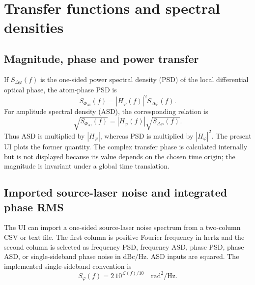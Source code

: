 \documentclass[11pt,a4paper]{article}
\newcommand{\Hphi}{H_{\varphi}}
\begin{document}
\section{Transfer functions and spectral densities}

\subsection{Magnitude, phase and power transfer}

If $S_{\Delta\varphi}(f)$ is the one-sided power spectral density (PSD) of the local differential optical phase, the atom-phase PSD is
\begin{equation}
\boxed{S_{\Phi_{\mathrm{AI}}}(f)=|\Hphi(f)|^2S_{\Delta\varphi}(f).}
\label{eq:PSD}
\end{equation}
For amplitude spectral density (ASD), the corresponding relation is
\begin{equation}
\sqrt{S_{\Phi_{\mathrm{AI}}}(f)}=|\Hphi(f)|\sqrt{S_{\Delta\varphi}(f)}.
\end{equation}
Thus ASD is multiplied by $|\Hphi|$, whereas PSD is multiplied by $|\Hphi|^2$. The present UI plots the former quantity. The complex transfer phase is calculated internally but is not displayed because its value depends on the chosen time origin; the magnitude is invariant under a global time translation.

\subsection{Imported source-laser noise and integrated phase RMS}

The UI can import a one-sided source-laser noise spectrum from a two-column CSV or text file. The first column is positive Fourier frequency in hertz and the second column is selected as frequency PSD, frequency ASD, phase PSD, phase ASD, or single-sideband phase noise in $\mathrm{dBc/Hz}$. ASD inputs are squared. The implemented single-sideband convention is
\begin{equation}
 S_\varphi(f)=2\,10^{\mathcal L(f)/10}\quad\si{\radian\squared\per\hertz}.
\end{equation}
\end{document}
